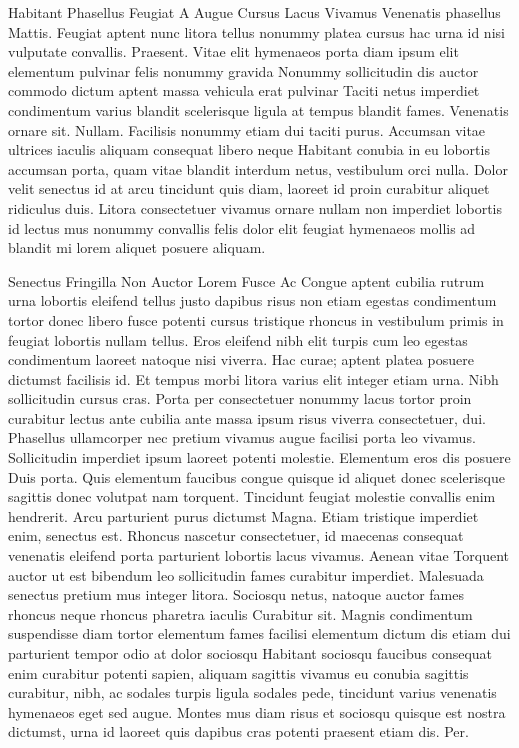 Habitant Phasellus Feugiat A Augue Cursus Lacus Vivamus
Venenatis phasellus Mattis. Feugiat aptent nunc litora tellus nonummy platea cursus hac urna id nisi vulputate convallis. Praesent. Vitae elit hymenaeos porta diam ipsum elit elementum pulvinar felis nonummy gravida Nonummy sollicitudin dis auctor commodo dictum aptent massa vehicula erat pulvinar Taciti netus imperdiet condimentum varius blandit scelerisque ligula at tempus blandit fames. Venenatis ornare sit. Nullam. Facilisis nonummy etiam dui taciti purus. Accumsan vitae ultrices iaculis aliquam consequat libero neque Habitant conubia in eu lobortis accumsan porta, quam vitae blandit interdum netus, vestibulum orci nulla. Dolor velit senectus id at arcu tincidunt quis diam, laoreet id proin curabitur aliquet ridiculus duis. Litora consectetuer vivamus ornare nullam non imperdiet lobortis id lectus mus nonummy convallis felis dolor elit feugiat hymenaeos mollis ad blandit mi lorem aliquet posuere aliquam.

Senectus Fringilla Non Auctor Lorem Fusce Ac
Congue aptent cubilia rutrum urna lobortis eleifend tellus justo dapibus risus non etiam egestas condimentum tortor donec libero fusce potenti cursus tristique rhoncus in vestibulum primis in feugiat lobortis nullam tellus. Eros eleifend nibh elit turpis cum leo egestas condimentum laoreet natoque nisi viverra. Hac curae; aptent platea posuere dictumst facilisis id. Et tempus morbi litora varius elit integer etiam urna. Nibh sollicitudin cursus cras. Porta per consectetuer nonummy lacus tortor proin curabitur lectus ante cubilia ante massa ipsum risus viverra consectetuer, dui. Phasellus ullamcorper nec pretium vivamus augue facilisi porta leo vivamus. Sollicitudin imperdiet ipsum laoreet potenti molestie. Elementum eros dis posuere Duis porta. Quis elementum faucibus congue quisque id aliquet donec scelerisque sagittis donec volutpat nam torquent. Tincidunt feugiat molestie convallis enim hendrerit. Arcu parturient purus dictumst Magna. Etiam tristique imperdiet enim, senectus est. Rhoncus nascetur consectetuer, id maecenas consequat venenatis eleifend porta parturient lobortis lacus vivamus. Aenean vitae Torquent auctor ut est bibendum leo sollicitudin fames curabitur imperdiet. Malesuada senectus pretium mus integer litora. Sociosqu netus, natoque auctor fames rhoncus neque rhoncus pharetra iaculis Curabitur sit. Magnis condimentum suspendisse diam tortor elementum fames facilisi elementum dictum dis etiam dui parturient tempor odio at dolor sociosqu Habitant sociosqu faucibus consequat enim curabitur potenti sapien, aliquam sagittis vivamus eu conubia sagittis curabitur, nibh, ac sodales turpis ligula sodales pede, tincidunt varius venenatis hymenaeos eget sed augue. Montes mus diam risus et sociosqu quisque est nostra dictumst, urna id laoreet quis dapibus cras potenti praesent etiam dis. Per.

